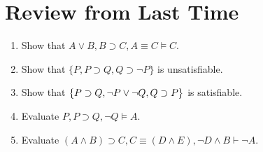 \documentclass[a4paper, 11pt]{article} %
\begin{document}


\section*{Review from Last Time}

\begin{enumerate}
  \item Show that $A \vee B, B \supset C, A \equiv C \vDash C$.
  \item Show that $\{P, P \supset Q, Q \supset \neg P\}$ is unsatisfiable. 
  \item Show that $\lbrace P \supset Q, \neg P \vee \neg Q, Q \supset P\rbrace$ is satisfiable.
  \item Evaluate $P, P \supset Q, \neg Q \vDash A$.
  \item Evaluate $(A \wedge B) \supset C, C \equiv (D \wedge E), \neg D \wedge B \vdash \neg A$.
\end{enumerate}
\end{document}
